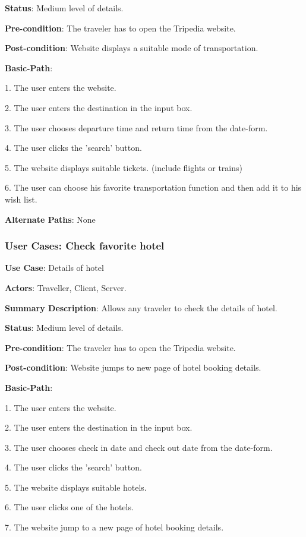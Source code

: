 \documentclass[conference]{IEEEtran}
\begin{document}
\textbf{Status}: Medium level of details.

\textbf{Pre-condition}: The traveler has to open the Tripedia website.

\textbf{Post-condition}: Website displays a suitable mode of transportation.

\textbf{Basic-Path}:

1. The user enters the website.

2. The user enters the destination in the input box.

3. The user chooses departure time and return time from the date-form.

4. The user clicks the 'search' button.

5. The website displays suitable tickets. (include flights or trains)

6. The user can choose his favorite transportation function and then add it to his wish list.

\textbf{Alternate Paths}: None

\subsubsection{User Cases: Check favorite hotel}

\textbf{ }

\textbf{Use Case}: Details of hotel

\textbf{Actors}: Traveller, Client, Server.

\textbf{Summary Description}: Allows any traveler to check the details of hotel.

\textbf{Status}: Medium level of details.

\textbf{Pre-condition}: The traveler has to open the Tripedia website.

\textbf{Post-condition}: Website jumps to new page of hotel booking details.

\textbf{Basic-Path}:

1. The user enters the website.

2. The user enters the destination in the input box.

3. The user chooses check in date and check out date from the date-form.

4. The user clicks the 'search' button.

5. The website displays suitable hotels.

6. The user clicks one of the hotels.

7. The website jump to a new page of hotel booking details.
\end{document}
